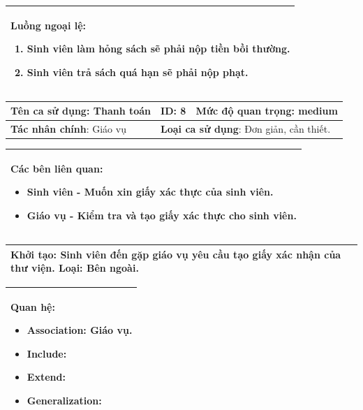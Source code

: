 \documentclass[../report.tex]{subfiles}
\begin{document}
\begin{center}
\begin{tabular}{| m{15.9cm} |}
    \hline
    \textbf{Luồng ngoại lệ}:
    \begin{enumerate}
        \item Sinh viên làm hỏng sách sẽ phải nộp tiền bồi thường. 
        \item Sinh viên trả sách quá hạn sẽ phải nộp phạt. 
    \end{enumerate} \\
    \hline
\end{tabular}

\newpage
\begin{tabular}{| m{6cm} | m{3cm} | m{6cm} |}
    \hline
    \textbf{Tên ca sử dụng}: Thanh toán & \textbf{ID}: 8 & \textbf{Mức độ quan trọng}: medium \\
    \hline
    \textbf{Tác nhân chính}: Giáo vụ  & \multicolumn{2}{|l|}{\textbf{Loại ca sử dụng}: Đơn giản, cần thiết.} \\
    \hline
\end{tabular}
\begin{tabular}{| m{15.9cm} |}
    \hline
        \textbf{Các bên liên quan:} 
        \begin{itemize}
            \item Sinh viên - Muốn xin giấy xác thực của sinh viên. 
            \item Giáo vụ - Kiểm tra và tạo giấy xác thực cho sinh viên. 
        \end{itemize} \\
    \hline
\end{tabular}

\begin{tabular}{| m{15.9cm} |}
    \hline
    \textbf{Khởi tạo}: Sinh viên đến gặp giáo vụ yêu cầu tạo giấy xác nhận của thư viện. 
    \textbf{Loại}: Bên ngoài.  \\
    \hline
\end{tabular}

\begin{tabular}{| m{15.9cm} |}
    \hline
    \textbf{Quan hệ}:
    \begin{itemize}
        \item Association: Giáo vụ. 
        \item Include: 
        \item Extend: 
        \item Generalization: 
    \end{itemize} \\
    \hline
\end{tabular}


\end{center}
\end{document}
